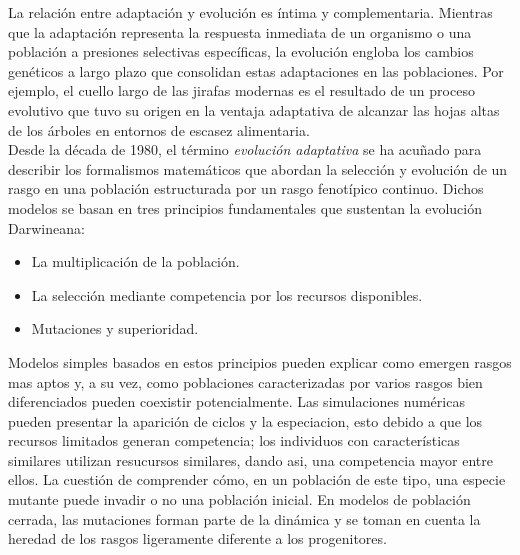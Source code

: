 \documentclass[letterpaper]{article}
\begin{document}
{{            \normalsize{La relación entre adaptación y evolución es íntima y complementaria. Mientras que la adaptación representa la respuesta inmediata de un organismo o una población a presiones selectivas específicas, la evolución engloba los cambios genéticos a largo plazo que consolidan estas adaptaciones en las poblaciones. Por ejemplo, el cuello largo de las jirafas modernas es el resultado de un proceso evolutivo que tuvo su origen en la ventaja adaptativa de alcanzar las hojas altas de los árboles en entornos de escasez alimentaria.}\\

            \normalsize{Desde la década de 1980, el término \textit{evolución adaptativa} se ha acuñado para describir los formalismos matemáticos que abordan la selección y evolución de un rasgo en una población estructurada por un rasgo fenotípico continuo. Dichos modelos se basan en tres principios fundamentales que sustentan la evolución Darwineana:}
            \begin{itemize}
                    \item {
                    
                        \normalsize{La multiplicación de la población.}

                    }
                    
                    \item {
                    
                        \normalsize{La selección mediante competencia por los recursos disponibles.}
                    }
                    
                    \item {
                    
                        \normalsize{Mutaciones y superioridad.}

                    }
                \end{itemize}
                
            \normalsize{Modelos simples basados en estos principios pueden explicar como emergen rasgos mas aptos y, a su vez, como poblaciones caracterizadas por varios rasgos bien diferenciados pueden coexistir potencialmente. Las simulaciones numéricas pueden presentar la aparición de ciclos y la especiacion, esto debido a que los recursos limitados generan competencia; los individuos con características similares utilizan resucursos similares, dando asi, una competencia mayor entre ellos. La cuestión de comprender cómo, en un población de este tipo, una especie mutante puede invadir o no una población inicial. En modelos de población cerrada, las mutaciones forman parte de la dinámica y se toman en cuenta la heredad de los rasgos ligeramente diferente a los progenitores.}
        }
        
}
\end{document}
